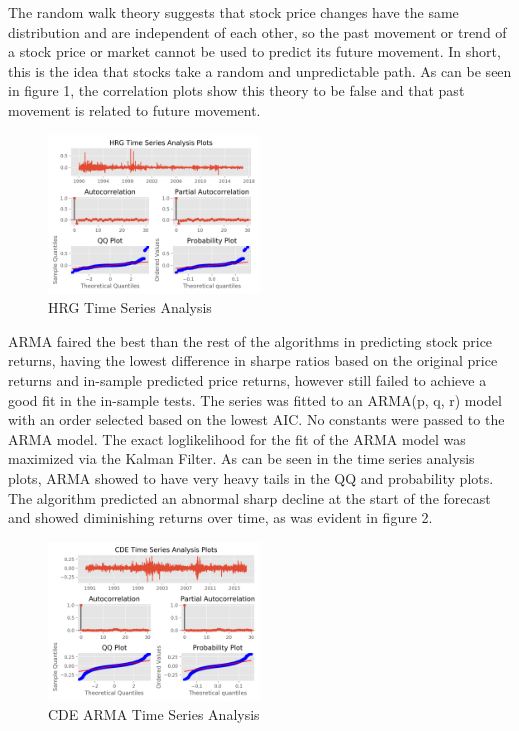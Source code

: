 \documentclass[times]{jtitauth}
\begin{document}
The random walk theory suggests that stock price changes have the same distribution and are independent of each other, so the past movement or trend of a stock price or market cannot be used to predict its future movement. In short, this is the idea that stocks take a random and unpredictable path. As can be seen in figure 1, the correlation plots show this theory to be false and that past movement is related to future movement.

\begin{figure}[!hbp]
\includegraphics[width=0.5\textwidth]{HRG-time-series.png}
\caption{HRG Time Series Analysis}
\end{figure}

ARMA faired the best than the rest of the algorithms in predicting stock price returns, having the lowest difference in sharpe ratios based on the original price returns and in-sample predicted price returns, however still failed to achieve a good fit in the in-sample tests. The series was fitted to an ARMA(p, q, r) model with an order selected based on the lowest AIC. No constants were passed to the ARMA model. The exact loglikelihood for the fit of the ARMA model was maximized via the Kalman Filter. As can be seen in the time series analysis plots, ARMA showed to have very heavy tails in the QQ and probability plots. The algorithm predicted an abnormal sharp decline at the start of the forecast and showed diminishing returns over time, as was evident in figure 2.

\begin{figure}[!hbp]
\includegraphics[width=0.5\textwidth]{CDE-ARMA-time-series.png}
\caption{CDE ARMA Time Series Analysis}
\end{figure}
\end{document}
